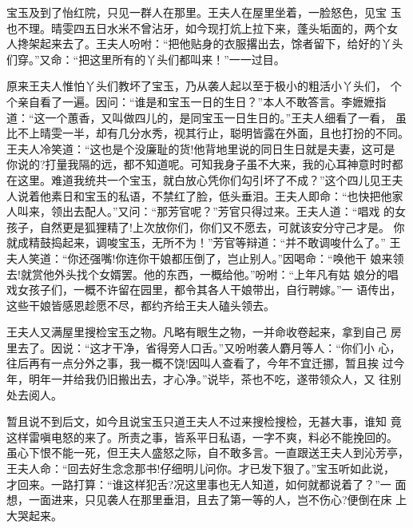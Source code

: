 宝玉及到了怡红院，只见一群人在那里。王夫人在屋里坐着，一脸怒色，见宝
玉也不理。晴雯四五日水米不曾沾牙，如今现打炕上拉下来，蓬头垢面的，两个女
人搀架起来去了。王夫人吩咐：“把他贴身的衣服撂出去，馀者留下，给好的丫头
们穿。”又命：“把这里所有的丫头们都叫来！”一一过目。

原来王夫人惟怕丫头们教坏了宝玉，乃从袭人起以至于极小的粗活小丫头们，
个个亲自看了一遍。因问：“谁是和宝玉一日的生日？”本人不敢答言。李嬷嬷指
道：“这一个蕙香，又叫做四儿的，是同宝玉一日生日的。”王夫人细看了一看，
虽比不上晴雯一半，却有几分水秀，视其行止，聪明皆露在外面，且也打扮的不同。
王夫人冷笑道：“这也是个没廉耻的货!他背地里说的同日生日就是夫妻，这可是
你说的?打量我隔的远，都不知道呢。可知我身子虽不大来，我的心耳神意时时都
在这里。难道我统共一个宝玉，就白放心凭你们勾引坏了不成？”这个四儿见王夫
人说着他素日和宝玉的私语，不禁红了脸，低头垂泪。王夫人即命：“也快把他家
人叫来，领出去配人。”又问：“那芳官呢？”芳官只得过来。王夫人道：“唱戏
的女孩子，自然更是狐狸精了!上次放你们，你们又不愿去，可就该安分守己才是。
你就成精鼓捣起来，调唆宝玉，无所不为！”芳官等辩道：“并不敢调唆什么了。”
王夫人笑道：“你还强嘴!你连你干娘都压倒了，岂止别人。”因喝命：“唤他干
娘来领去!就赏他外头找个女婿罢。他的东西，一概给他。”吩咐：“上年凡有姑
娘分的唱戏女孩子们，一概不许留在园里，都令其各人干娘带出，自行聘嫁。”一
语传出，这些干娘皆感恩趁愿不尽，都约齐给王夫人磕头领去。

王夫人又满屋里搜检宝玉之物。凡略有眼生之物，一并命收卷起来，拿到自己
房里去了。因说：“这才干净，省得旁人口舌。”又吩咐袭人麝月等人：“你们小
心，往后再有一点分外之事，我一概不饶!因叫人查看了，今年不宜迁挪，暂且挨
过今年，明年一并给我仍旧搬出去，才心净。”说毕，茶也不吃，遂带领众人，又
往别处去阅人。

暂且说不到后文，如今且说宝玉只道王夫人不过来搜检搜检，无甚大事，谁知
竟这样雷嗔电怒的来了。所责之事，皆系平日私语，一字不爽，料必不能挽回的。
虽心下恨不能一死，但王夫人盛怒之际，自不敢多言。一直跟送王夫人到沁芳亭，
王夫人命：“回去好生念念那书!仔细明儿问你。才已发下狠了。”宝玉听如此说，
才回来。一路打算：“谁这样犯舌?况这里事也无人知道，如何就都说着了？”一
面想，一面进来，只见袭人在那里垂泪，且去了第一等的人，岂不伤心?便倒在床
上大哭起来。

